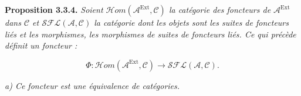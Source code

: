 \medskip\noindent\textbf{Proposition 3.3.4.}\quad
\textit{Soient
$\mathcal H\!om(\mathcal A^{\operatorname{Ext}},\mathcal C)$ la catégorie
des foncteurs de $\mathcal A^{\operatorname{Ext}}$ dans $\mathcal C$ et
$\mathcal{SFL}(\mathcal A,\mathcal C)$ la catégorie dont les objets sont les
suites de foncteurs liés et les morphismes, les morphismes de suites de
foncteurs liés. Ce qui précède définit un foncteur :}

\[
\Phi\colon
\mathcal H\!om(\mathcal A^{\operatorname{Ext}},\mathcal C)
\longrightarrow\mathcal{SFL}(\mathcal A,\mathcal C).
\]

\noindent\textit{a) Ce foncteur est une équivalence de catégories.}
\endgroup
